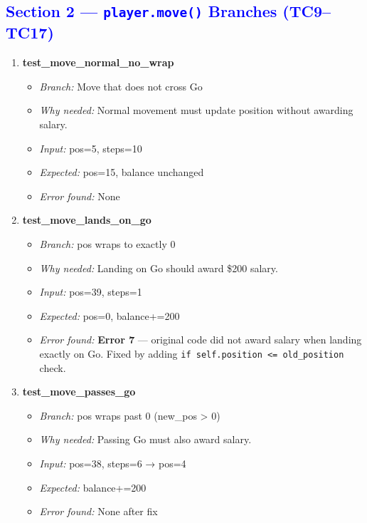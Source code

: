 \documentclass{article}
\begin{document}
\subsection*{\textcolor{blue}{Section 2 — \texttt{player.move()} Branches (TC9–TC17)}}

\begin{enumerate}[resume, label=\textbf{TC\arabic*.}]

  \item \textbf{test\_move\_normal\_no\_wrap}
  \begin{itemize}[noitemsep]
    \item \textit{Branch:} Move that does not cross Go
    \item \textit{Why needed:} Normal movement must update position without awarding salary.
    \item \textit{Input:} pos=5, steps=10
    \item \textit{Expected:} pos=15, balance unchanged
    \item \textit{Error found:} None
  \end{itemize}

  \item \textbf{test\_move\_lands\_on\_go}
  \begin{itemize}[noitemsep]
    \item \textit{Branch:} pos wraps to exactly 0
    \item \textit{Why needed:} Landing on Go should award \$200 salary.
    \item \textit{Input:} pos=39, steps=1
    \item \textit{Expected:} pos=0, balance+=200
    \item \textit{Error found:} \textbf{Error 7} — original code did not award salary when landing exactly on Go. Fixed by adding \texttt{if self.position <= old\_position} check.
  \end{itemize}

  \item \textbf{test\_move\_passes\_go}
  \begin{itemize}[noitemsep]
    \item \textit{Branch:} pos wraps past 0 (new\_pos > 0)
    \item \textit{Why needed:} Passing Go must also award salary.
    \item \textit{Input:} pos=38, steps=6 → pos=4
    \item \textit{Expected:} balance+=200
    \item \textit{Error found:} None after fix
  \end{itemize}


\end{enumerate}
\end{document}
